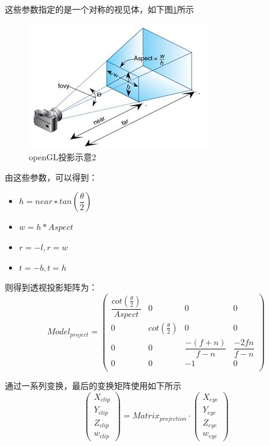 \documentclass[UTF8,a4paper,8pt]{ctexbook}
\begin{document}
			这些参数指定的是一个对称的视见体，如下图\ref{ts2}所示
				\begin{figure}[htbp]
					\centering
					\includegraphics[scale = 1]{toushi2.png}
					\caption{openGL投影示意2}
					\label{ts2}
				\end{figure}
		
			由这些参数，可以得到： 
				\begin{itemize}[itemindent = 1em]
					\item $h=near∗tan(\dfrac{\theta}{2})$
					\item $w=h*Aspect$
					\item $r=−l,r=w$
					\item $t=−b,t=h$
				\end{itemize}
				
			则得到透视投影矩阵为：
				$$
				Model_{project} =  
				\left(
				\begin{array}{cccc}
				\dfrac{cot(\frac{\theta}{2})}{Aspect} & 0 & 0& 0\\
				
				0 & cot(\frac{\theta}{2}) & 0& 0\\
				
				0 & 0 & \dfrac{-(f+n)}{f-n}& \dfrac{-2fn}{f-n}\\
				
				0 & 0 & -1& 0\\
				\end{array}
				\right)
				$$
				
			通过一系列变换，最后的变换矩阵使用如下所示	
				$$ 	
				\left(
				\begin{array}{c}
					X_{clip}\\ 
					Y_{clip}\\
					Z_{clip}\\
					w_{clip}
				\end{array}	
				\right) 
				=
				Matrix_{projection}
				\cdot
				\left(
				\begin{array}{c}
				X_{eye}\\ 
				Y_{eye}\\
				Z_{eye}\\
				w_{eye}
				\end{array}	
				\right) 
				$$	
			
\end{document}
